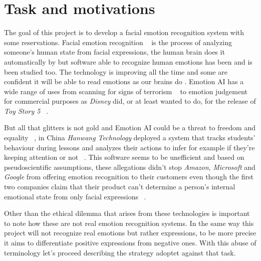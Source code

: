 \section{Task and motivations}
The goal of this project is to develop a facial emotion recognition system with some reservations.
Facial emotion recognition ~\cite{blog:facial_recognition} is the process of analyzing someone's human state from facial expressions, the human brain does it automatically by but software able to  recognize human emotions has been and is been studied too. 
The technology is improving all the time and some are confident it will be able to read emotions as our brains do .
Emotion AI has a wide range of uses from scanning for signs of terrorism ~\cite{blog:terrorism} to emotion judgement for commercial purposes as \textit{Disney} did, or at least wanted to do, for the release of \textit{Toy Story 5} ~\cite{blog:disney}.

But all that glitters is not gold and Emotion AI could be a threat to freedom and equality ~\cite{blog:china1}, in China \textit{Hanwang Technology} deployed a system that tracks students' behaviour during lessons and analyzes their actions to infer for example if they're keeping attention or not ~\cite{blog:china3}. 
This software seems to be unefficient and based on pseudoscientific assumptions,  these allegations didn't stop \textit{Amazon}, \textit{Microsoft} and \textit{Google} from offering emotion recognition to their customers even though the first two companies claim that their product can't determine a person's internal emotional state from only facial expressions ~\cite{blog:china2}. 

Other than the ethical dilemma that arises from these technologies is important to note how these are not real emotion recognition systems.
In the same way this project will not recognize real emotions but rather expressions, to be more precise it aims to differentiate positive expressions from negative ones.
With this abuse of terminology let's proceed describing the strategy adoptet against that task.